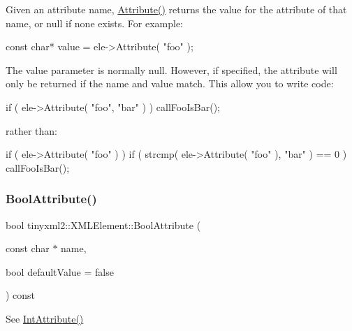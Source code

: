 Given an attribute name, \mbox{\hyperlink{classtinyxml2_1_1_x_m_l_element_a48cf4a315cfbac7d74cd0d5ff2c5df51}{Attribute()}} returns the value for the attribute of that name, or null if none exists. For example\+:

\begin{DoxyVerb}const char* value = ele->Attribute( "foo" );
\end{DoxyVerb}


The \textquotesingle{}value\textquotesingle{} parameter is normally null. However, if specified, the attribute will only be returned if the \textquotesingle{}name\textquotesingle{} and \textquotesingle{}value\textquotesingle{} match. This allow you to write code\+:

\begin{DoxyVerb}if ( ele->Attribute( "foo", "bar" ) ) callFooIsBar();
\end{DoxyVerb}


rather than\+: \begin{DoxyVerb}if ( ele->Attribute( "foo" ) ) {
    if ( strcmp( ele->Attribute( "foo" ), "bar" ) == 0 ) callFooIsBar();
}
\end{DoxyVerb}
 \mbox{\label{classtinyxml2_1_1_x_m_l_element_a53eda26131e1ad1031ef8ec8adb51bd8}} 
\subsubsection{\texorpdfstring{Bool\+Attribute()}{BoolAttribute()}}
{\footnotesize\ttfamily bool tinyxml2\+::\+X\+M\+L\+Element\+::\+Bool\+Attribute (\begin{DoxyParamCaption}\item[{const char $\ast$}]{name,  }\item[{bool}]{default\+Value = {\ttfamily false} }\end{DoxyParamCaption}) const}



See \mbox{\hyperlink{classtinyxml2_1_1_x_m_l_element_a95a89b13bb14a2d4655e2b5b406c00d4}{Int\+Attribute()}} 

\mbox{\label{classtinyxml2_1_1_x_m_l_element_a68569f59f6382bcea7f5013ec59736d2}} 
